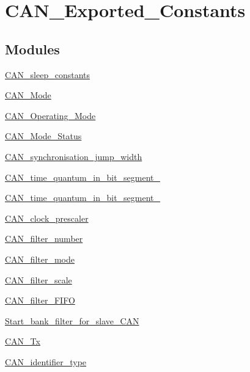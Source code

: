 \hypertarget{group___c_a_n___exported___constants}{}\section{C\+A\+N\+\_\+\+Exported\+\_\+\+Constants}
\label{group___c_a_n___exported___constants}
\subsection*{Modules}
\begin{DoxyCompactItemize}
\item 
\hyperlink{group___c_a_n__sleep__constants}{C\+A\+N\+\_\+sleep\+\_\+constants}
\item 
\hyperlink{group___c_a_n___mode}{C\+A\+N\+\_\+\+Mode}
\item 
\hyperlink{group___c_a_n___operating___mode}{C\+A\+N\+\_\+\+Operating\+\_\+\+Mode}
\item 
\hyperlink{group___c_a_n___mode___status}{C\+A\+N\+\_\+\+Mode\+\_\+\+Status}
\item 
\hyperlink{group___c_a_n__synchronisation__jump__width}{C\+A\+N\+\_\+synchronisation\+\_\+jump\+\_\+width}
\item 
\hyperlink{group___c_a_n__time__quantum__in__bit__segment__1}{C\+A\+N\+\_\+time\+\_\+quantum\+\_\+in\+\_\+bit\+\_\+segment\+\_}
\item 
\hyperlink{group___c_a_n__time__quantum__in__bit__segment__2}{C\+A\+N\+\_\+time\+\_\+quantum\+\_\+in\+\_\+bit\+\_\+segment\+\_}
\item 
\hyperlink{group___c_a_n__clock__prescaler}{C\+A\+N\+\_\+clock\+\_\+prescaler}
\item 
\hyperlink{group___c_a_n__filter__number}{C\+A\+N\+\_\+filter\+\_\+number}
\item 
\hyperlink{group___c_a_n__filter__mode}{C\+A\+N\+\_\+filter\+\_\+mode}
\item 
\hyperlink{group___c_a_n__filter__scale}{C\+A\+N\+\_\+filter\+\_\+scale}
\item 
\hyperlink{group___c_a_n__filter___f_i_f_o}{C\+A\+N\+\_\+filter\+\_\+\+F\+I\+FO}
\item 
\hyperlink{group___start__bank__filter__for__slave___c_a_n}{Start\+\_\+bank\+\_\+filter\+\_\+for\+\_\+slave\+\_\+\+C\+AN}
\item 
\hyperlink{group___c_a_n___tx}{C\+A\+N\+\_\+\+Tx}
\item 
\hyperlink{group___c_a_n__identifier__type}{C\+A\+N\+\_\+identifier\+\_\+type}

\end{DoxyCompactItemize}
